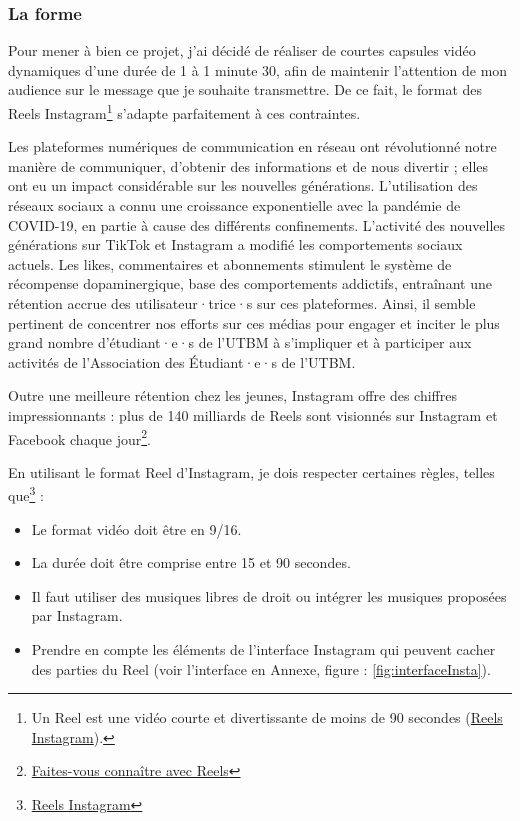 \subsubsection{La forme}

Pour mener à bien ce projet, j'ai décidé de réaliser de courtes capsules vidéo dynamiques d'une durée de 1 à 1 minute 30, afin de maintenir l'attention de mon audience sur le message que je souhaite transmettre.
De ce fait, le format des Reels Instagram\footnote{Un Reel est une vidéo courte et divertissante de moins de 90 secondes (\href{https://about.instagram.com/fr-fr/features/reels}{Reels Instagram}).} s'adapte parfaitement à ces contraintes.

Les plateformes numériques de communication en réseau ont révolutionné notre manière de communiquer, d'obtenir des informations et de nous divertir ; elles ont eu un impact considérable sur les nouvelles générations.
L'utilisation des réseaux sociaux a connu une croissance exponentielle avec la pandémie de COVID-19, en partie à cause des différents confinements.
L'activité des nouvelles générations sur TikTok et Instagram a modifié les comportements sociaux actuels.
Les likes, commentaires et abonnements stimulent le système de récompense dopaminergique, base des comportements addictifs\cite{pedrouzo2023hyperconnected}, entraînant une rétention accrue des utilisateur·trice·s sur ces plateformes.
Ainsi, il semble pertinent de concentrer nos efforts sur ces médias pour engager et inciter le plus grand nombre d'étudiant·e·s de l'\gls{UTBM} à s'impliquer et à participer aux activités de l'Association des Étudiant·e·s de l'\gls{UTBM}.

Outre une meilleure rétention chez les jeunes, Instagram offre des chiffres impressionnants : plus de 140 milliards de Reels sont visionnés sur Instagram et Facebook chaque jour\footnote{\href{https://business.instagram.com/instagram-reels?locale=fr_FR}{Faites-vous connaître avec Reels}}.

En utilisant le format Reel d'Instagram, je dois respecter certaines règles, telles que\footnote{\href{https://about.instagram.com/fr-fr/features/reels}{Reels Instagram}} :
\begin{itemize}
    \item Le format vidéo doit être en 9/16.
    \item La durée doit être comprise entre 15 et 90 secondes.
    \item Il faut utiliser des musiques libres de droit ou intégrer les musiques proposées par Instagram.
    \item Prendre en compte les éléments de l'interface Instagram qui peuvent cacher des parties du Reel (voir l'interface en Annexe, figure : \ref{fig:interfaceInsta}).
\end{itemize}

